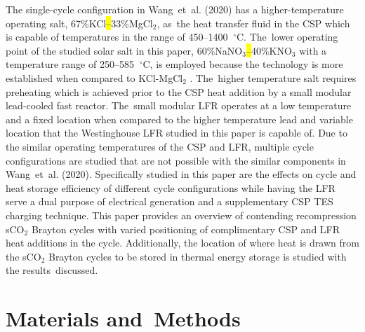 \documentclass[sustainability,article,accept,moreauthors,pdftex]{Definitions/mdpi}
\begin{document}
The single-cycle configuration in Wang~et~al. (2020) has a higher-temperature operating salt, 67\%KCl\hl{--}33\%MgCl$_2$, as~the heat transfer fluid in the CSP which is capable of temperatures in the range of 450--1400 $~^{\circ}$C. The~lower operating point of the studied solar salt in this paper, 60\%NaNO$_3$\hl{--}40\%KNO$_3$ %
with a temperature range of 250--585 $~^{\circ}$C, is employed because the technology is more established when compared to KCl-MgCl$_2$ \cite{turchi_2018}. The~higher temperature salt requires preheating which is achieved prior to the CSP heat addition by a small modular lead-cooled fast reactor. The~small modular LFR operates at a low temperature and a fixed location when compared to the higher temperature lead and variable location that the Westinghouse LFR studied in this paper is capable of. Due to the similar operating temperatures of the CSP and LFR, multiple cycle configurations are studied that are not possible with the similar components in Wang~et~al. (2020). Specifically studied in this paper are the effects on cycle and heat storage efficiency of different cycle configurations while having the LFR serve a dual purpose of electrical generation and a supplementary CSP TES charging technique. This paper provides an overview of contending recompression sCO$_2$ Brayton cycles with varied positioning of complimentary CSP and LFR heat additions in the cycle. Additionally, the location of where heat is drawn from the sCO$_2$ Brayton cycles to be stored in thermal energy storage is studied with the results~discussed.



 
\section{Materials and~Methods}


\end{document}
